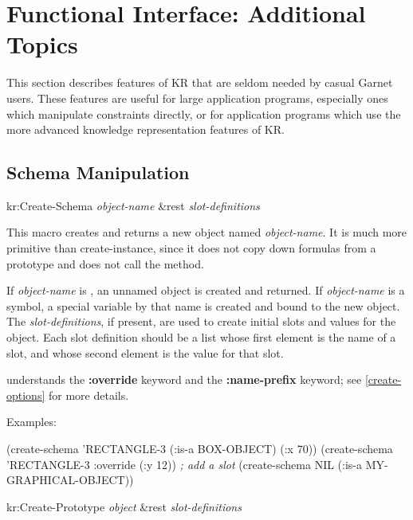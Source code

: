\chapter{Functional Interface: Additional Topics}
\value{top}

\label{additional-functions} This section describes features of KR that
are seldom needed by casual Garnet users.  These features are useful for large
application programs, especially ones which manipulate constraints
directly, or for application programs which use the more advanced knowledge
representation features of KR.


\section{Schema Manipulation}
\value{s-top}

\begin{example}
kr:Create-Schema {\it object-name} \&rest {\it slot-definitions}\value{macro}
\end{example}

This macro creates and returns a new object
named {\it object-name}.  It is much more primitive than
create-instance, since it does not copy down formulas from a prototype
and does not call the  method.

If {\it object-name} is \value{nil}, an unnamed object is created and
returned.  If {\it object-name} is a symbol, a special variable by that name
is created and bound to the new object.  The {\it slot-definitions}, if
present, are used to create initial slots and values for the object.  Each
slot definition should be a list whose first element is the name of a slot,
and whose second element is the value for that slot.

 understands the {\bf :override} keyword and the
{\bf :name-prefix} keyword; see \ref{create-options} for more details.

Examples:
\begin{programexample}
(create-schema 'RECTANGLE-3 (:is-a BOX-OBJECT) (:x 70))
(create-schema 'RECTANGLE-3 :override (:y 12))   {\it ; add a slot}
(create-schema NIL (:is-a MY-GRAPHICAL-OBJECT))
\end{programexample}



\value{f-top}
\begin{example}
kr:Create-Prototype {\it object} \&rest {\it slot-definitions}\value{macro}
\end{example}

